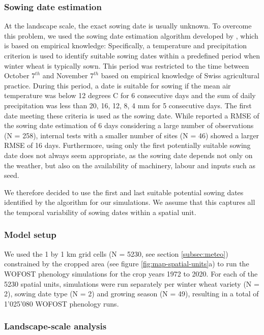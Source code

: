\subsubsection{Sowing date estimation}
\label{subsubsec:sowing-date-estimation}
At the landscape scale, the exact sowing date is usually unknown. To overcome this problem, we used the sowing date estimation algorithm developed by \cite{holzkamper_spatial_2015}, which is based on empirical knowledge: Specifically, a temperature and precipitation criterion is used to identify suitable sowing dates within a predefined period when winter wheat is typically sown. This period was restricted to the time between October $7^{th}$ and November $7^{th}$ based on empirical knowledge of Swiss agricultural practice. During this period, a date is suitable for sowing if the mean air temperature was below 12 degrees C for 6 consecutive days and the sum of daily precipitation was less than 20, 16, 12, 8, 4 mm for 5 consecutive days. The first date meeting these criteria is used as the sowing date. While \cite{holzkamper_spatial_2015} reported a \gls{RMSE} of the sowing date estimation of 6 days considering a large number of observations (N = 258), internal tests with a smaller number of sites (N = 46) showed a larger \gls{RMSE} of 16 days. Furthermore, using only the first potentially suitable sowing date does not always seem appropriate, as the sowing date depends not only on the weather, but also on the availability of machinery, labour and inputs such as seed.

We therefore decided to use the first and last suitable potential sowing dates identified by the algorithm for our simulations. We assume that this captures all the temporal variability of sowing dates within a spatial unit.

\subsubsection{Model setup}
We used the 1 by 1 km grid cells (N = 5230, see section \ref{subsec:meteo}) constrained by the cropped area (see figure \ref{fig:map-spatial-units}a) to run the \gls{WOFOST} phenology simulations for the crop years 1972 to 2020. For each of the 5230 spatial units, simulations were run separately per winter wheat variety (N = 2), sowing date type (N = 2) and growing season (N = 49), resulting in a total of 1'025'080 \gls{WOFOST} phenology runs.

\subsubsection{Landscape-scale analysis}

